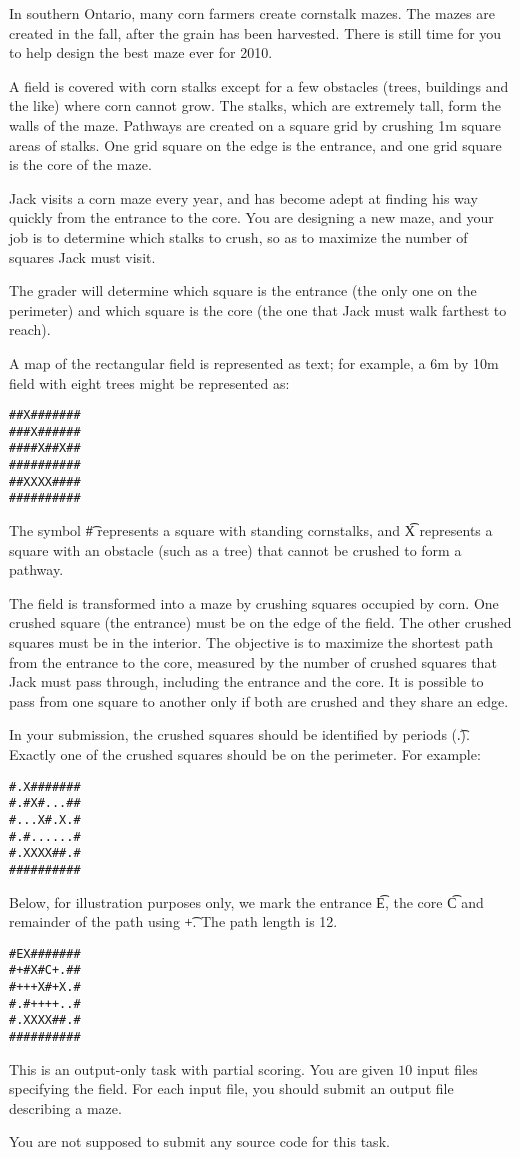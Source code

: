 In southern Ontario, many corn farmers create cornstalk mazes. The mazes are created in the fall, after the grain has been harvested. There is still time for you to help design the best maze ever for 2010.

A field is covered with corn stalks except for a few obstacles (trees, buildings and the
like) where corn cannot grow. The stalks, which are extremely tall, form the walls of
the maze. Pathways are created on a square grid by crushing 1m square areas of
stalks. One grid square on the edge is the entrance, and one grid square is the core of
the maze.

Jack visits a corn maze every year, and has become adept at finding his way quickly
from the entrance to the core. You are designing a new maze, and your job is to
determine which stalks to crush, so as to maximize the number of squares Jack must
visit.

The grader will determine which square is the entrance (the only one on the perimeter)
and which square is the core (the one that Jack must walk farthest to reach).

A map of the rectangular field is represented as text; for example, a 6m by 10m field
with eight trees might be represented as:

\begin{verbatim}
##X#######
###X######
####X##X##
##########
##XXXX####
##########
\end{verbatim}

The symbol \t{\#} represents a square with standing cornstalks, and \t{X} represents a square with an obstacle (such as a tree) that cannot be crushed to form a pathway.

The field is transformed into a maze by crushing squares occupied by corn. One
crushed square (the entrance) must be on the edge of the field. The other crushed
squares must be in the interior. The objective is to maximize the shortest path from the entrance to the core, measured by the number of crushed squares that Jack must pass through, including the entrance and the core. It is possible to pass from one square to another only if both are crushed and they share an edge.

In your submission, the crushed squares should be identified by periods (\t{.}). Exactly
one of the crushed squares should be on the perimeter. For example:
\begin{verbatim}
#.X#######
#.#X#...##
#...X#.X.#
#.#......#
#.XXXX##.#
##########
\end{verbatim}

Below, for illustration purposes only, we mark the entrance \t{E}, the core \t{C} and
remainder of the path using \t{+}. The path length is 12.

\begin{verbatim}
#EX#######
#+#X#C+.##
#+++X#+X.#
#.#++++..#
#.XXXX##.#
##########
\end{verbatim}

This is an output-only task with partial scoring.
You are given $10$ input files specifying the field.
For each input file, you should submit an output file describing a maze.

You are not supposed to submit any source code for this task.

